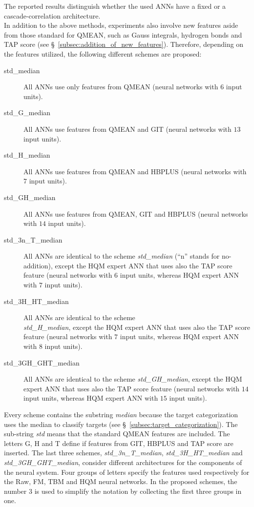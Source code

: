 The reported results distinguish whether the used ANNs have a fixed or a ca\-sca\-de-\-cor\-re\-la\-tion architecture.\\
In addition to the above methods, experiments also involve new features aside from those standard for QMEAN, such as Gauss integrals, hydrogen bonds and TAP score (see \S~\ref{subsec:addition_of_new_features}). Therefore, depending on the features utilized, the following different schemes are proposed:
\begin{description}
\item[std\_median] All ANNs use only features from QMEAN (neural networks with $6$ input units).
\item[std\_G\_median] All ANNs use features from QMEAN and GIT (neural networks with $13$ input units).
\item[std\_H\_median] All ANNs use features from QMEAN and HBPLUS (neural networks with $7$ input units).
\item[std\_GH\_median] All ANNs use features from QMEAN, GIT and HBPLUS (neural networks with $14$ input units).
\item[std\_3n\_T\_median] All ANNs are identical to the scheme \emph{std\_median} (``n'' stands for no-addition), except the HQM expert ANN that uses also the TAP score feature (neural networks with $6$ input units, whereas HQM expert ANN with $7$ input units).
\item[std\_3H\_HT\_median] All ANNs are identical to the scheme \\\emph{std\_H\_median}, except the HQM expert ANN that uses also the TAP score feature (neural networks with $7$ input units, whereas HQM expert ANN with $8$ input units).
\item[std\_3GH\_GHT\_median] All ANNs are identical to the scheme \emph{std\_GH\_\-median}, except the HQM expert ANN that uses also the TAP score  feature (neural networks with $14$ input units, whereas HQM expert ANN with $15$ input units).
\end{description}
Every scheme contains the substring \emph{median} because the target categorization uses the median to classify targets (see \S~\ref{subsec:target_categorization}). The sub-string \emph{std} means that the standard QMEAN features are included. The letters G, H and T define if features from GIT, HBPLUS and TAP score are inserted. The last three schemes, \emph{std\_3n\_T\_median}, \emph{std\_3H\_HT\_median} and \emph{std\_3GH\_GHT\_\-median}, consider different architectures for the components of the neural system. Four groups of letters specify the features used respectively for the Raw, FM, TBM and HQM neural networks. In the proposed schemes, the number $3$ is used to simplify the notation by collecting the first three groups in one.

